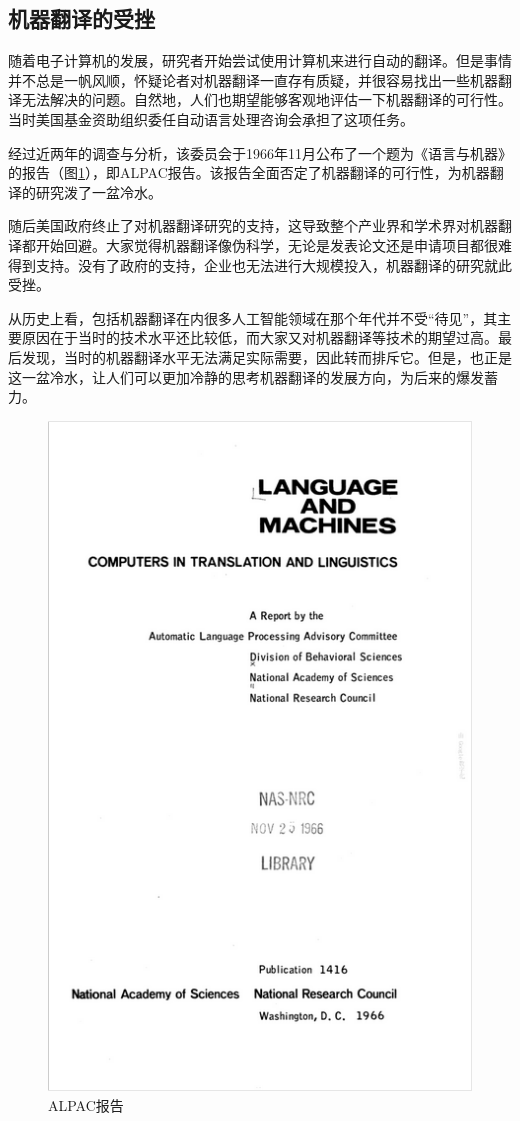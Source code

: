 \subsection{机器翻译的受挫}

\parinterval 随着电子计算机的发展，研究者开始尝试使用计算机来进行自动的翻译。但是事情并不总是一帆风顺，怀疑论者对机器翻译一直存有质疑，并很容易找出一些机器翻译无法解决的问题。自然地，人们也期望能够客观地评估一下机器翻译的可行性。当时美国基金资助组织委任自动语言处理咨询会承担了这项任务。

\parinterval 经过近两年的调查与分析，该委员会于1966年11月公布了一个题为《语言与机器》的报告（图\ref{fig:1-5}），即ALPAC报告。该报告全面否定了机器翻译的可行性，为机器翻译的研究泼了一盆冷水。

\parinterval 随后美国政府终止了对机器翻译研究的支持，这导致整个产业界和学术界对机器翻译都开始回避。大家觉得机器翻译像伪科学，无论是发表论文还是申请项目都很难得到支持。没有了政府的支持，企业也无法进行大规模投入，机器翻译的研究就此受挫。

\parinterval 从历史上看，包括机器翻译在内很多人工智能领域在那个年代并不受``待见''，其主要原因在于当时的技术水平还比较低，而大家又对机器翻译等技术的期望过高。最后发现，当时的机器翻译水平无法满足实际需要，因此转而排斥它。但是，也正是这一盆冷水，让人们可以更加冷静的思考机器翻译的发展方向，为后来的爆发蓄力。

\begin{figure}[htp]
    \centering
\includegraphics[scale=0.65]{./Chapter1/Figures/figure-report.jpg}
    \caption{ALPAC报告}
    \label{fig:1-5}
\end{figure}

